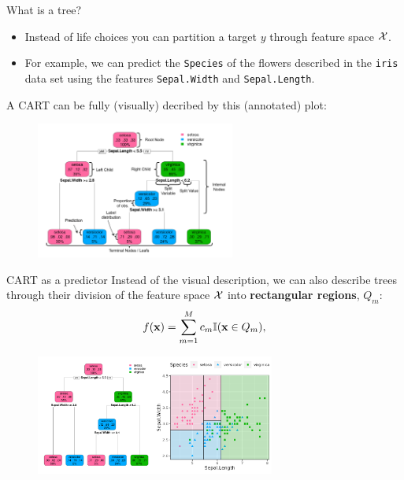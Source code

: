 \documentclass[11pt,compress,t,notes=noshow, xcolor=table]{beamer}
\begin{document}
\begin{vbframe}{What is a tree?}

\begin{itemize}
\item Instead of life choices you can partition a target $y$ through feature space $\mathcal{X}$.
\item For example, we can predict the \texttt{Species} of the flowers described in the \texttt{iris} data set using the features \texttt{Sepal.Width} and \texttt{Sepal.Length}.
\end{itemize}
A CART can be fully (visually) decribed by this (annotated) plot:
  
     \begin{figure}
    \centering
      \includegraphics[height = 4.5cm, keepaspectratio]{figure/cart_intro_annotated-tree.pdf}
    \end{figure}
\end{vbframe}

\begin{vbframe}{CART as a predictor}
Instead of the visual description, we can also describe trees through their division of the feature space $\mathcal{X}$ into \textbf{rectangular regions}, $Q_m$: 
  \begin{align*}
    f(\mathbf{x}) = \sum_{m=1}^M c_m \mathbb{I}(\mathbf{x} \in Q_m),
  \end{align*}
  \begin{figure}
    \centering
\includegraphics[width=0.7\textwidth, keepaspectratio]{figure/tree-classif-depth-3-blacklines.pdf}
    \end{figure}
\end{vbframe}
\end{document}
